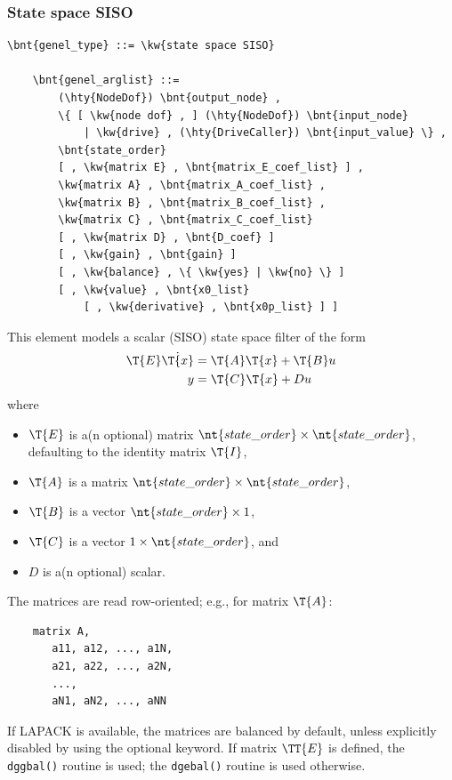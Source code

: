 \subsubsection{State space SISO}
\label{sec:EL:GENEL:STATE-SPACE-SISO}
\begin{Verbatim}[commandchars=\\\{\}]
    \bnt{genel_type} ::= \kw{state space SISO}

    \bnt{genel_arglist} ::=
        (\hty{NodeDof}) \bnt{output_node} ,
        \{ [ \kw{node dof} , ] (\hty{NodeDof}) \bnt{input_node}
            | \kw{drive} , (\hty{DriveCaller}) \bnt{input_value} \} ,
        \bnt{state_order}
        [ , \kw{matrix E} , \bnt{matrix_E_coef_list} ] ,
        \kw{matrix A} , \bnt{matrix_A_coef_list} ,
        \kw{matrix B} , \bnt{matrix_B_coef_list} ,
        \kw{matrix C} , \bnt{matrix_C_coef_list}
        [ , \kw{matrix D} , \bnt{D_coef} ]
        [ , \kw{gain} , \bnt{gain} ]
        [ , \kw{balance} , \{ \kw{yes} | \kw{no} \} ]
        [ , \kw{value} , \bnt{x0_list}
            [ , \kw{derivative} , \bnt{x0p_list} ] ]
\end{Verbatim}
This element models a scalar (SISO) state space filter of the form
\begin{align*}
	\T{E} \dot{\T{x}} &= \T{A} \T{x} + \T{B} u \\
	y &= \T{C} \T{x} + D u
\end{align*}
where
\begin{itemize}
\item $\T{E}$ is a(n optional) matrix
	$\nt{state\_order} \times \nt{state\_order}$, defaulting to the identity matrix $\T{I}$,
\item $\T{A}$ is a matrix
	$\nt{state\_order} \times \nt{state\_order}$,
\item $\T{B}$ is a vector
	$\nt{state\_order} \times 1$,
\item $\T{C}$ is a vector
	$1 \times \nt{state\_order}$, and
\item $D$ is a(n optional) scalar.
\end{itemize}
The matrices are read row-oriented; e.g., for matrix $\T{A}$:
\begin{verbatim}
    matrix A,
       a11, a12, ..., a1N,
       a21, a22, ..., a2N,
       ...,
       aN1, aN2, ..., aNN
\end{verbatim}

If LAPACK is available, the matrices are balanced by default,
unless explicitly disabled by using the  optional keyword.
If matrix $\TT{E}$ is defined, the \texttt{dggbal()} routine is used;
the \texttt{dgebal()} routine is used otherwise.

